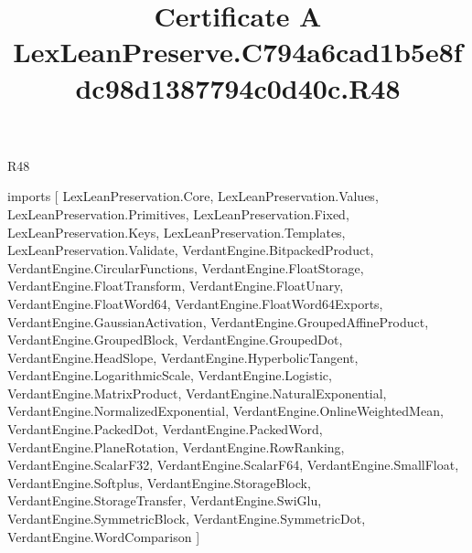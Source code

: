 \begin{lexlean}{R48}
\title{Certificate A LexLeanPreserve.C794a6cad1b5e8fdc98d1387794c0d40c.R48}
\begin{coremodule}
imports [
  LexLeanPreservation.Core,
  LexLeanPreservation.Values,
  LexLeanPreservation.Primitives,
  LexLeanPreservation.Fixed,
  LexLeanPreservation.Keys,
  LexLeanPreservation.Templates,
  LexLeanPreservation.Validate,
  VerdantEngine.BitpackedProduct,
  VerdantEngine.CircularFunctions,
  VerdantEngine.FloatStorage,
  VerdantEngine.FloatTransform,
  VerdantEngine.FloatUnary,
  VerdantEngine.FloatWord64,
  VerdantEngine.FloatWord64Exports,
  VerdantEngine.GaussianActivation,
  VerdantEngine.GroupedAffineProduct,
  VerdantEngine.GroupedBlock,
  VerdantEngine.GroupedDot,
  VerdantEngine.HeadSlope,
  VerdantEngine.HyperbolicTangent,
  VerdantEngine.LogarithmicScale,
  VerdantEngine.Logistic,
  VerdantEngine.MatrixProduct,
  VerdantEngine.NaturalExponential,
  VerdantEngine.NormalizedExponential,
  VerdantEngine.OnlineWeightedMean,
  VerdantEngine.PackedDot,
  VerdantEngine.PackedWord,
  VerdantEngine.PlaneRotation,
  VerdantEngine.RowRanking,
  VerdantEngine.ScalarF32,
  VerdantEngine.ScalarF64,
  VerdantEngine.SmallFloat,
  VerdantEngine.Softplus,
  VerdantEngine.StorageBlock,
  VerdantEngine.StorageTransfer,
  VerdantEngine.SwiGlu,
  VerdantEngine.SymmetricBlock,
  VerdantEngine.SymmetricDot,
  VerdantEngine.WordComparison
]


\end{coremodule}
\end{lexlean}
